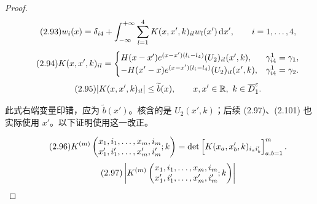 \begin{proof}
\begin{equation}\originaleq{2.93}
w_i(x)=\delta_{i4}+\int_{-\infty}^{+\infty}\sum\limits_{l=1}^4K(x,x',k)_{il}w_l(x')\dd x',
\qquad i=1,\ldots,4,
\end{equation}
\begin{equation}\originaleq{2.94}
K(x,x',k)_{il}=\begin{cases}
H(x-x')e^{(x-x')(l_i-l_4)}(U_2)_{il}(x',k),&\gamma_{i4}^1=\gamma_1,\\
-H(x'-x)e^{(x-x')(l_i-l_4)}(U_2)_{il}(x',k),&\gamma_{i4}^1=\gamma_2.
\end{cases}
\end{equation}
\begin{equation}\originaleq{2.95}
|K(x,x',k)_{il}|\leq\widetilde b(x),\qquad x,x'\in\mathbb R,\ k\in\overline D_1^\varepsilon.
\end{equation}
\begin{note}
此式右端变量印错，应为 $\widetilde b(x')$。核含的是 $U_2(x',k)$；后续 (2.97)、(2.101) 也实际使用 $x'$。以下证明使用这一改正。
\end{note}
\begin{equation}\originaleq{2.96}
K^{(m)}\left(\begin{matrix}x_1,i_1,\ldots,x_m,i_m\\x'_1,i'_1,\ldots,x'_m,i'_m\end{matrix};k\right)
=\det\left[K(x_a,x'_b,k)_{i_ai'_b}\right]_{a,b=1}^m.
\end{equation}
\begin{equation}\originaleq{2.97}
\left|K^{(m)}\left(\begin{matrix}x_1,i_1,\ldots,x_m,i_m\\x'_1,i'_1,\ldots,x'_m,i'_m\end{matrix};k\right)\right|

\end{equation}
\end{proof}
